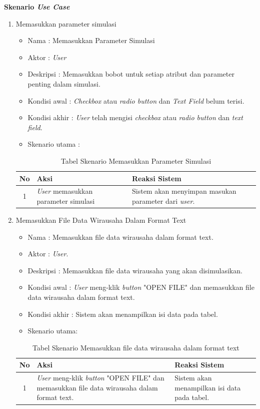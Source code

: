 \textbf{Skenario \textit{Use Case}}
\begin{enumerate}
	\item Memasukkan parameter simulasi
	
		\begin{itemize}
			\item Nama : Memasukkan Parameter Simulasi
			\item Aktor : \textit{User}
			\item Deskripsi : Memasukkan bobot untuk setiap atribut dan parameter penting dalam simulasi.
			\item Kondisi awal : \textit{Checkbox} atau \textit{radio button} dan \textit{Text Field} belum terisi.
			\item Kondisi akhir : \textit{User} telah mengisi \textit{checkbox} atau \textit{radio button} dan \textit{text field}.
			\item Skenario utama :
		\end{itemize}
		
\begin{table}[H]
\centering
\caption{Tabel Skenario Memasukkan Parameter Simulasi}
\begin{tabular}{|c|p{7cm}|p{7cm}|}
\hline
No & Aksi & Reaksi Sistem\\
\hline
1 & \textit{User} memasukkan parameter simulasi & Sistem akan menyimpan masukan parameter dari \textit{user}.\\
\hline
\end{tabular}
\label{tabelSkenario1}
\end{table}

	\item Memasukkan File Data Wirausaha Dalam Format Text
	\begin{itemize}
		\item Nama : Memasukkan file data wirausaha dalam format text.
		\item Aktor : \textit{User}.
		\item Deskripsi : Memasukkan file data wirausaha yang akan disimulasikan.
		\item Kondisi awal : \textit{User} meng-klik \textit{button} "OPEN FILE" dan memasukkan file data wirausaha dalam format text.
		\item Kondisi akhir : Sistem akan menampilkan isi data pada tabel.
		\item Skenario utama:
	\end{itemize}
	
	\begin{table}[H]
\centering
\caption{Tabel Skenario Memasukkan file data wirausaha dalam format text}
\begin{tabular}{|c|p{7cm}|p{7cm}|}
\hline
No & Aksi & Reaksi Sistem\\
\hline
1 & \textit{User} meng-klik \textit{button} "OPEN FILE" dan memasukkan file data wirausaha dalam format text. & Sistem akan menampilkan isi data pada tabel. \\
\hline
\end{tabular}
\label{tabelSkenario2}
\end{table}


\end{enumerate}
